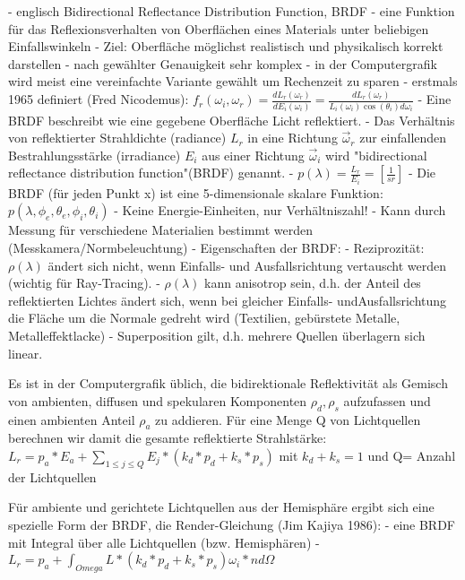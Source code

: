 \documentclass[10pt,landscape]{article}
\makeatletter
\renewcommand{\subsection}{\@startsection{subsection}{2}{0mm}%
                                {-1explus -.5ex minus -.2ex}%
                                {0.5ex plus .2ex}%
                                {\normalfont\normalsize\bfseries}}
\makeatother
\begin{document}
\begin{multicols}{3}
  
  - englisch Bidirectional Reflectance Distribution Function, BRDF
  - eine Funktion für das Reflexionsverhalten von Oberflächen eines Materials unter beliebigen Einfallswinkeln
  - Ziel: Oberfläche möglichst realistisch und physikalisch korrekt darstellen
  - nach gewählter Genauigkeit sehr komplex
  - in der Computergrafik wird meist eine vereinfachte Variante gewählt um Rechenzeit zu sparen
  - erstmals 1965 definiert (Fred Nicodemus): $f_r(\omega_i, \omega_r)=\frac{dL_r(\omega_r)}{dE_i(\omega_i)}=\frac{dL_r(\omega_r)}{L_i(\omega_i)\cos(\theta_i)d\omega_i}$
  - Eine BRDF beschreibt wie eine gegebene Oberfläche Licht reflektiert.
  - Das Verhältnis von reflektierter Strahldichte (radiance) $L_r$ in eine Richtung $\vec{ω}_r$ zur einfallenden Bestrahlungsstärke (irradiance) $E_i$ aus einer Richtung $\vec{ω}_i$ wird "bidirectional reflectance distribution function"(BRDF) genannt.
  - $p(\lambda)=\frac{L_r}{E_i}=[\frac{1}{sr}]$
  - Die BRDF (für jeden Punkt x) ist eine 5-dimensionale skalare Funktion: $p(\lambda, \phi_e, \theta_e, \phi_i, \theta_i)$
  - Keine Energie-Einheiten, nur Verhältniszahl!
  - Kann durch Messung für verschiedene Materialien bestimmt werden (Messkamera/Normbeleuchtung)
  - Eigenschaften der BRDF:
  - Reziprozität: $ρ(\lambda)$ ändert sich nicht, wenn Einfalls- und Ausfallsrichtung vertauscht werden (wichtig für Ray-Tracing).
  - $ρ(\lambda)$ kann anisotrop sein, d.h. der Anteil des reflektierten Lichtes ändert sich, wenn bei gleicher Einfalls- undAusfallsrichtung die Fläche um die Normale gedreht wird (Textilien, gebürstete Metalle, Metalleffektlacke)
  - Superposition gilt, d.h. mehrere Quellen überlagern sich linear.
  
  Es ist in der Computergrafik üblich, die bidirektionale Reflektivität als Gemisch von ambienten, diffusen und spekularen Komponenten $ρ_d, ρ_s$ aufzufassen und
  einen ambienten Anteil $ρ_a$ zu addieren. Für eine Menge Q von Lichtquellen berechnen wir damit die gesamte reflektierte Strahlstärke: $L_r=p_a*E_a+\sum_{1\leq j \leq Q} E_j * (k_d*p_d + k_s*p_s)$ mit $k_d+k_s=1$ und Q= Anzahl der Lichtquellen
  
  Für ambiente und gerichtete Lichtquellen aus der Hemisphäre ergibt sich eine spezielle Form der BRDF, die Render-Gleichung (Jim Kajiya 1986):
  - eine BRDF mit Integral über alle Lichtquellen (bzw. Hemisphären)
  - $L_r=p_a + \int_{Omega} L*(k_d*p_d+k_s*p_s) \omega_i*n d\Omega$
  

\end{multicols}
\end{document}
